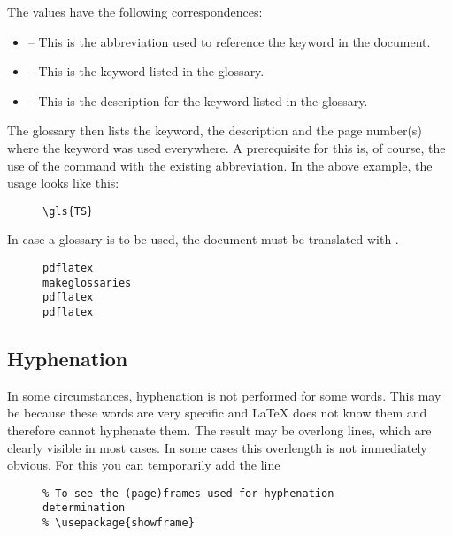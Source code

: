 The values have the following correspondences:

\begin{itemize}
    \item {} -- This is the abbreviation used to reference the
          keyword in the document.
    \item {} -- This is the keyword listed in the
          glossary.
    \item {} -- This is the description for the
          keyword listed in the glossary.
\end{itemize}

The glossary then lists the keyword, the description and the page number(s)
where the keyword was used everywhere. A prerequisite for this is, of course,
the use of the command  with
the existing abbreviation. In the above example, the usage looks like this:

\begin{figure}[H]
    \small
    \centering
    \begin{BVerbatim}
\gls{TS}
    \end{BVerbatim}
\end{figure}

In case a glossary is to be used, the document must be translated with
.

\begin{figure}[H]
    \small
    \centering
    \begin{BVerbatim}
pdflatex
makeglossaries
pdflatex
pdflatex
    \end{BVerbatim}
\end{figure}

\subsection{Hyphenation}

In some circumstances, hyphenation is not performed for some words. This may
be because these words are very specific and \LaTeX{} does not know them and
therefore cannot hyphenate them. The result may be overlong lines, which are
clearly visible in most cases. In some cases this overlength is not
immediately obvious. For this you can temporarily add the line

\begin{figure}[H]
    \small
    \centering
    \begin{BVerbatim}
    \end{BVerbatim}
\end{figure}

